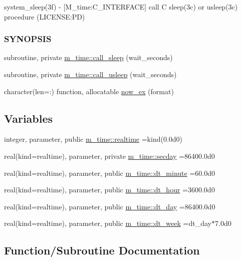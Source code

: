 \begin{DoxyCompactItemize}
\begin{DoxyCompactList}
system\+\_\+sleep(3f) -\/ \mbox{[}M\+\_\+time\+:C\+\_\+\+I\+N\+T\+E\+R\+F\+A\+CE\mbox{]} call C sleep(3c) or usleep(3c) procedure (L\+I\+C\+E\+N\+SE\+:PD) \subsubsection*{S\+Y\+N\+O\+P\+S\+IS}\end{DoxyCompactList}\item 
subroutine, private \mbox{\hyperlink{namespacem__time_af558bfc1fd5b13a6b879b3969866956f}{m\+\_\+time\+::call\+\_\+sleep}} (wait\+\_\+seconds)
\item 
subroutine, private \mbox{\hyperlink{namespacem__time_ae63783f7479d2f5093c8031d38ce4304}{m\+\_\+time\+::call\+\_\+usleep}} (wait\+\_\+seconds)
\item 
character(len=\+:) function, allocatable \mbox{\hyperlink{M__time_8f90_a09223e2da0c23850fad035407582fd68}{now\+\_\+ex}} (format)
\end{DoxyCompactItemize}
\subsection*{Variables}
\begin{DoxyCompactItemize}
\item 
integer, parameter, public \mbox{\hyperlink{namespacem__time_ac10ea9e8d59ec74eaa7d89f2517d7422}{m\+\_\+time\+::realtime}} =kind(0.\+0d0)
\item 
real(kind=realtime), parameter, private \mbox{\hyperlink{namespacem__time_a48130b5a95a3f2e776269dcee1426797}{m\+\_\+time\+::secday}} =86400.\+0d0
\item 
real(kind=realtime), parameter, public \mbox{\hyperlink{namespacem__time_a9fe6fbb44e2779a2fcf96fba36c08918}{m\+\_\+time\+::dt\+\_\+minute}} =60.\+0d0
\item 
real(kind=realtime), parameter, public \mbox{\hyperlink{namespacem__time_aa0ca2172092f5e7dcc9b8524e6516fd8}{m\+\_\+time\+::dt\+\_\+hour}} =3600.\+0d0
\item 
real(kind=realtime), parameter, public \mbox{\hyperlink{namespacem__time_a97725f8d657c24badff19a794f323a6b}{m\+\_\+time\+::dt\+\_\+day}} =86400.\+0d0
\item 
real(kind=realtime), parameter, public \mbox{\hyperlink{namespacem__time_a3d53519e90264faccdae67e389ffc003}{m\+\_\+time\+::dt\+\_\+week}} =dt\+\_\+day$\ast$7.\+0d0
\end{DoxyCompactItemize}


\subsection{Function/\+Subroutine Documentation}
\mbox{\label{M__time_8f90_a09223e2da0c23850fad035407582fd68}} 
